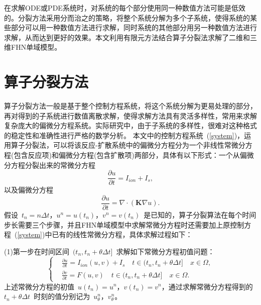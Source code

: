 \documentclass[twoside,UTF8]{nputhesis}
\begin{document}
在求解ODE或PDE系统时，对系统的每个部分使用同一种数值方法可能是低效的\cite{split2006}。分裂方法\cite{split2008}采用分而治之的策略，将整个系统分解为多个子系统，使得系统的某些部分可以用一种数值方法进行求解，同时系统的其他部分用另一种数值方法进行求解，从而达到更好的效果。本文利用有限元方法结合算子分裂法求解了二维和三维FHN单域模型。
\section{算子分裂方法}

算子分裂方法\cite{split2007}一般是基于整个控制方程系统，将这个系统分解为更易处理的部分，再对得到的子系统进行数值离散求解，使得求解方法具有灵活多样性，常用来求解复杂庞大的偏微分方程系统。实际研究中，由于子系统的多样性，很难对这种格式的稳定性和准确性进行严格的数学分析\cite{bodo2009}。
本文中的控制方程系统~(\ref{system})，运用算子分裂法，可以将该反应-扩散系统中的偏微分方程分为一个非线性常微分方程(包含反应项)和偏微分方程(包含扩散项)两部分，具体有以下形式：一个从偏微分方程分裂出来的常微分方程
\begin{equation}
\frac{\partial u}{\partial t}=I_{ion}+I_s,
\end{equation}
以及偏微分方程
\begin{equation}
\frac{\partial u}{\partial t}=\nabla\cdot(\textbf{K}\nabla u).
\end{equation}
假设~$t_n=n\Delta t$，$u^n=u(t_n)$，$v^n=v(t_n)$~是已知的，算子分裂算法在每个时间步长需要三个步骤，并且FHN单域模型中求解常微分方程时还需要加上原控制方程~(\ref{system})中已有的线性常微分方程，具体求解过程如下：

(1)第一步在时间区间~$(t_n,t_n+\theta\Delta t]$~求解如下常微分方程初值问题：
\begin{equation*}
\left\{\begin{aligned}&\frac{\partial u}{\partial t}=I_{ion}(u,v)+I_s \quad t\in(t_n,t_n+\theta \Delta t]\quad x\in\Omega,\\& \frac{\partial v}{\partial t}=F(u,v) \quad t\in(t_n,t_n+\theta \Delta t] \quad x\in\Omega.\end{aligned}\right.
\label{1.2}
\end{equation*}
上述常微分方程的初值~$u(t_n)=u^n$，$v(t_n)=v^n$，通过求解常微分方程得到的~$t_n+\theta\Delta t$~时刻的值分别记为~$u^n_\theta$，$v^n_\theta$。
\end{document}
